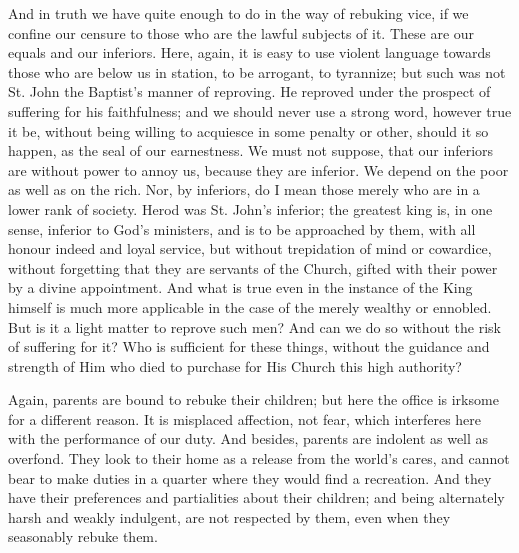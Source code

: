 And in truth we have quite enough to do in the way of rebuking vice,
if we confine our censure to those who are the lawful subjects of it.
These are our equals and our inferiors. Here, again, it is easy to use
violent language towards those who are below us in station, to be
arrogant, to tyrannize; but such was not St. John the Baptist's manner
of reproving. He reproved under the prospect of suffering for his
faithfulness; and we should never use a strong word, however true it be,
without being willing to acquiesce in some penalty or other, should it
so happen, as the seal of our earnestness. We must not suppose, that our
inferiors are without power to annoy us, because they are inferior. We
depend on the poor as well as on the rich. Nor, by inferiors, do I mean
those merely who are in a lower rank of society. Herod was St. John's
inferior; the greatest king is, in one sense, inferior to God's
ministers, and is to be approached by them, with all honour indeed and
loyal service, but without trepidation of mind or cowardice, without
forgetting that they are servants of the Church, gifted with their power
by a divine appointment. And what is true even in the instance of the
King himself is much more applicable in the case of the merely wealthy
or ennobled. But is it a light matter to reprove such men? And can we do
so without the risk of suffering for it? Who is sufficient for these
things, without the guidance and strength of Him who died to purchase
for His Church this high authority?

Again, parents are bound to rebuke their children; but here the
office is irksome for a different reason. It is misplaced affection, not
fear, which interferes here with the performance of our duty. And
besides, parents are indolent as well as overfond. They look to their
home as a release from the world's cares, and cannot bear to make duties
in a quarter where they would find a recreation. And they have their
preferences and partialities about their children; and being alternately
harsh and weakly indulgent, are not respected by them, even when they
seasonably rebuke them.

